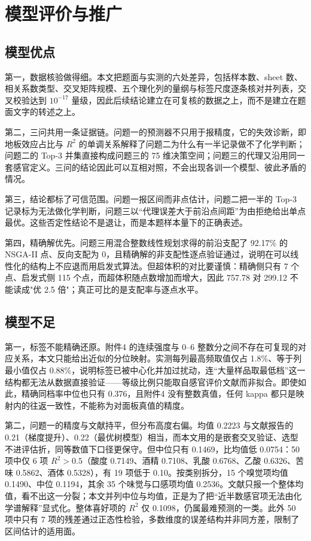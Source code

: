 \section{模型评价与推广}

\subsection{模型优点}

第一，数据核验做得细。本文把题面与实测的六处差异，包括样本数、sheet 数、相关系数类型、交叉矩阵规模、五个理化列的量纲与标签尺度逐条核对并列表，交叉校验达到 $10^{-17}$ 量级，因此后续结论建立在可复核的数据之上，而不是建立在题面文字的转述之上。

第二，三问共用一条证据链。问题一的预测器不只用于报精度，它的失效诊断，即地板效应占比与 $R^2$ 的单调关系解释了问题二为什么有一半记录做不了化学判断；问题二的 Top-3 并集直接构成问题三的 75 维决策空间；问题三的代理又沿用同一套感官定义。三问的结论因此可以互相对照，不会出现各训一个模型、彼此矛盾的情况。

第三，结论都标了可信范围。问题一报区间而非点估计，问题二把一半的 Top-3 记录标为无法做化学判断，问题三以“代理误差大于前沿点间距”为由拒绝给出单点最优。这些否定性结论不是退让，而是本题样本量下的正确表述。

第四，精确解优先。问题三用混合整数线性规划求得的前沿支配了 92.17\% 的 NSGA-II 点、反向支配为 0，且精确解的非支配性逐点验证通过，说明在可以线性化的结构上不应退而用启发式算法。但超体积的对比要谨慎：精确侧只有 7 个点、启发式侧 115 个点，而超体积随点数增加而增大，因此 757.78 对 299.12 不能读成"优 2.5 倍"；真正可比的是支配率与逐点水平。

\subsection{模型不足}

第一，标签不能精确还原。附件4 的连续强度与 0--6 整数分之间不存在可复现的对应关系，本文只能给出近似的分位映射。实测每列最高频取值仅占 1.8\%、等于列最小值仅占 0.88\%，说明标签已被中心化并加过扰动，连“大量样品取最低档”这一结构都无法从数据直接验证——等级比例只能取自感官评价文献而非拟合。即使如此，精确同档率中位也只有 0.376，且附件4 没有整数真值，任何 kappa 都只是映射内的往返一致性，不能称为对面板真值的精度。

第二，问题一的精度与文献持平，但分布高度右偏。均值 0.2223 与文献\cite{schreurs2024}报告的 0.21（梯度提升）、0.22（最优树模型）相当，而本文用的是嵌套交叉验证、选型不进评估折，同等数值下口径更保守。但中位只有 0.1469，比均值低 0.0754：50 项中仅 6 项 $R^2>0.5$（酸度 0.7149、酒精 0.7108、乳酸 0.6768、乙酸 0.6326、苦味 0.5862、酒体 0.5328），有 19 项低于 0.10。按类别拆分，15 个嗅觉项均值 0.1490、中位 0.1194，其余 35 个味觉与口感项均值 0.2536。文献只报一个整体均值，看不出这一分裂；本文并列中位与均值，正是为了把“近半数感官项无法由化学谱解释”显式化。整体喜好项的 $R^2$ 仅 0.1098，仍属最难预测的一类。此外 50 项中只有 7 项的残差通过正态性检验，多数维度的误差结构并非同方差，限制了区间估计的适用面。

